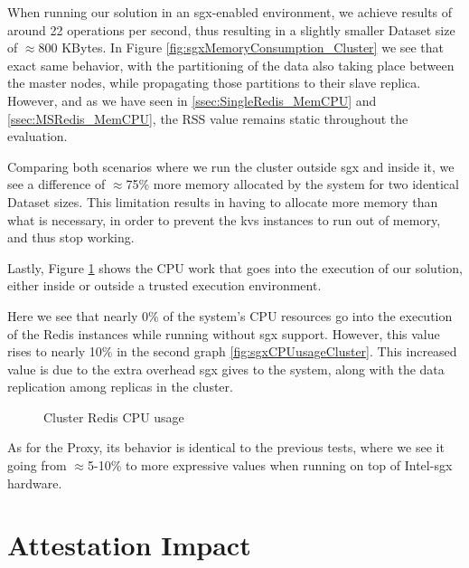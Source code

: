When running our solution in an \gls{sgx}-enabled environment, we achieve results of around 22 operations per second, thus resulting in a slightly smaller Dataset size of $\approx$800 KBytes. In Figure \ref{fig:sgxMemoryConsumption_Cluster} we see that exact same behavior, with the partitioning of the data also taking place between the master nodes, while propagating those partitions to their slave replica. 
However, and as we have seen in \ref{ssec:SingleRedis_MemCPU} and \ref{ssec:MSRedis_MemCPU}, the RSS value remains static throughout the evaluation. 



Comparing both scenarios where we run the cluster outside \gls{sgx} and inside it, we see a difference of $\approx$75\% more memory allocated by the system for two identical Dataset sizes. This limitation results in having to allocate more memory than what is necessary, in order to prevent the \gls{kvs} instances to run out of memory, and thus stop working.



Lastly, Figure \ref{fig:cpuUsageCluster} shows the CPU work that goes into the execution of our solution, either inside or outside a trusted execution environment. 

Here we see that nearly 0\% of the system's CPU resources go into the execution of the Redis instances while running without \gls{sgx} support. However, this value rises to nearly 10\% in the second graph \ref{fig:sgxCPUusageCluster}. This increased value is due to the extra overhead \gls{sgx} gives to the system, along with the data replication among replicas in the cluster.

\begin{figure}[htbp]
	\centering
	\caption{Cluster Redis CPU usage}
	\label{fig:cpuUsageCluster}
\end{figure}

As for the Proxy, its behavior is identical to the previous tests, where we see it going from $\approx$5-10\% to more expressive values when running on top of Intel-\gls{sgx} hardware.

\section{Attestation Impact}

